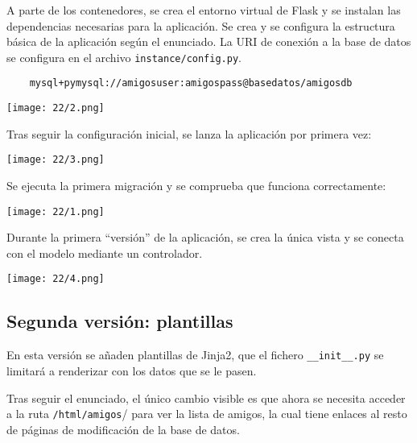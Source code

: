 A parte de los contenedores, se crea el entorno virtual de Flask y se instalan las
dependencias necesarias para la aplicación. Se crea y se configura la estructura básica
de la aplicación según el enunciado. La URI de conexión a la base de datos se configura
en el archivo \Verb#instance/config.py#.

\begin{verbatim}
	mysql+pymysql://amigosuser:amigospass@basedatos/amigosdb
\end{verbatim}

\begin{minipage}{\linewidth}
	\centering
	\texttt{[image: 22/2.png]}
	\label{fig:2/14}
\end{minipage}

Tras seguir la configuración inicial, se lanza la aplicación por primera vez:

\begin{minipage}{\linewidth}
	\centering
	\texttt{[image: 22/3.png]}
	\label{fig:2/16}
\end{minipage}
\newpage{}
Se ejecuta la primera migración y se comprueba que funciona correctamente:

\begin{minipage}{\linewidth}
	\centering
	\texttt{[image: 22/1.png]}
	\label{fig:2/15}
\end{minipage}

Durante la primera ``versión'' de la aplicación, se crea la única vista y
se conecta con el modelo mediante un controlador.

\begin{minipage}{\linewidth}
	\centering
	\texttt{[image: 22/4.png]}
	\label{fig:2/17}
\end{minipage}

\subsection{Segunda versión: plantillas}
En esta versión se añaden plantillas de Jinja2, que el fichero \Verb#__init__.py#
se limitará a renderizar con los datos que se le pasen.

Tras seguir el enunciado, el único cambio visible es que ahora se necesita acceder
a la ruta \Verb#/html/amigos#/ para ver la lista de amigos, la cual tiene enlaces
al resto de páginas de modificación de la base de datos.

